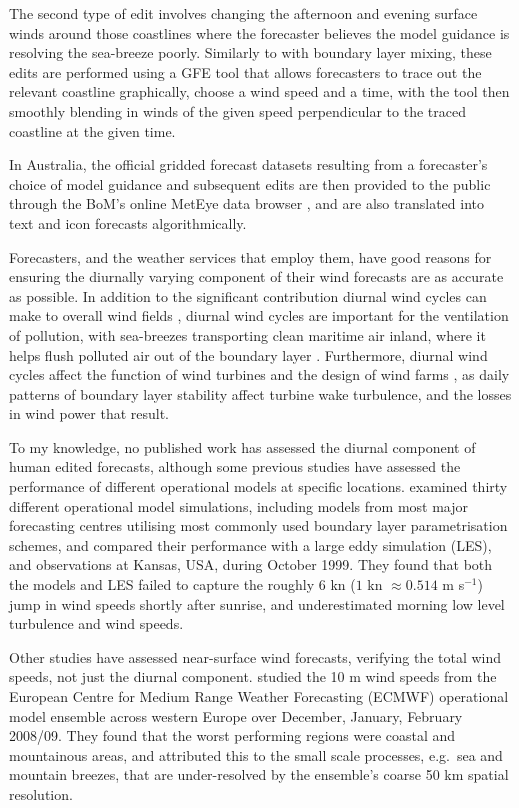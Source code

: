 \documentclass[twocol]{ametsoc}
\begin{document}
The second type of edit involves changing the afternoon and evening surface winds around those coastlines where the forecaster believes the model guidance is resolving the sea-breeze poorly. Similarly to with boundary layer mixing, these edits are performed using a GFE tool that allows forecasters to trace out the relevant coastline graphically, choose a wind speed and a time, with the tool then smoothly blending in winds of the given speed perpendicular to the traced coastline at the given time.

In Australia, the official gridded forecast datasets resulting from a forecaster's choice of model guidance and subsequent edits are then provided to the public through the BoM's online MetEye data browser \citep{bomMetEye19}, and are also translated into text and icon forecasts algorithmically. 

Forecasters, and the weather services that employ them, have good reasons for ensuring the diurnally varying component of their wind forecasts are as accurate as possible. In addition to the significant contribution diurnal wind cycles can make to overall wind fields \citep[e.g.][]{dai99}, diurnal wind cycles are important for the ventilation of pollution, with sea-breezes transporting clean maritime air inland, where it helps flush polluted air out of the boundary layer \citep{miller03, physick92}. Furthermore, diurnal wind cycles affect the function of wind turbines \citep{englberger18} and the design of wind farms \citep{abkar16}, as daily patterns of boundary layer stability affect turbine wake turbulence, and the losses in wind power that result.

To my knowledge, no published work has assessed the diurnal component of human edited forecasts, although some previous studies have assessed the performance of different operational models at specific locations. \citet{svensson11} examined thirty different operational model simulations, including models from most major forecasting centres utilising most commonly used boundary layer parametrisation schemes, and compared their performance with a large eddy simulation (LES), and observations at Kansas, USA, during October 1999. They found that both the models and LES failed to capture the roughly $6$ kn ($1$ kn $\approx 0.514$ m s$^{-1}$) jump in wind speeds shortly after sunrise, and underestimated morning low level turbulence and wind speeds.

Other studies have assessed near-surface wind forecasts, verifying the total wind speeds, not just the diurnal component. \citet{pinson12} studied the 10 m wind speeds from the European Centre for Medium Range Weather Forecasting (ECMWF) operational model ensemble across western Europe over December, January, February 2008/09. They found that the worst performing regions were coastal and mountainous areas, and attributed this to the small scale processes, e.g.~sea and mountain breezes, that are under-resolved by the ensemble's coarse 50 km spatial resolution.
\end{document}
